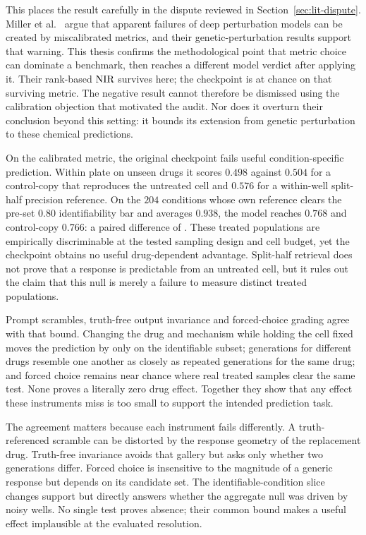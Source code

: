 This places the result carefully in the dispute reviewed in Section~\ref{sec:lit-dispute}.
Miller et al.~\cite{miller} argue that apparent failures of deep perturbation models can be created
by miscalibrated metrics, and their genetic-perturbation results support that warning. This thesis
confirms the methodological point that metric choice can dominate a benchmark, then reaches a
different model verdict after applying it. Their rank-based $\textrm{NIR}$ survives here; the checkpoint is
at chance on that surviving metric. The negative result cannot therefore be dismissed using the
calibration objection that motivated the audit. Nor does it overturn their conclusion beyond this
setting: it bounds its extension from genetic perturbation to these chemical predictions.

On the calibrated metric, the original checkpoint fails useful condition-specific prediction.
Within plate on unseen drugs it scores $0.498$ against $0.504$ for a control-copy that reproduces
the untreated cell and $0.576$ for a within-well split-half precision reference. On the $204$
conditions whose own reference clears the pre-set $0.80$ identifiability bar and averages $0.938$,
the model reaches $0.768$ and control-copy $0.766$: a paired difference of
. These treated populations are empirically discriminable at the tested
sampling design and cell budget, yet the checkpoint obtains no useful drug-dependent advantage.
Split-half retrieval does not prove that a response is predictable from an untreated cell, but it
rules out the claim that this null is merely a failure to measure distinct treated populations.

Prompt scrambles, truth-free output invariance and forced-choice grading agree with that bound.
Changing the drug and mechanism while holding the cell fixed moves the prediction by only
 on the identifiable subset; generations for different drugs resemble
one another as closely as repeated generations for the same drug; and forced choice remains near
chance where real treated samples clear the same test. None proves a literally zero drug effect.
Together they show that any effect these instruments miss is too small to support the intended
prediction task.

The agreement matters because each instrument fails differently. A truth-referenced scramble can
be distorted by the response geometry of the replacement drug. Truth-free invariance avoids that
gallery but asks only whether two generations differ. Forced choice is insensitive to the magnitude
of a generic response but depends on its candidate set. The identifiable-condition slice changes
support but directly answers whether the aggregate null was driven by noisy wells. No single test
proves absence; their common bound makes a useful effect implausible at the evaluated resolution.

